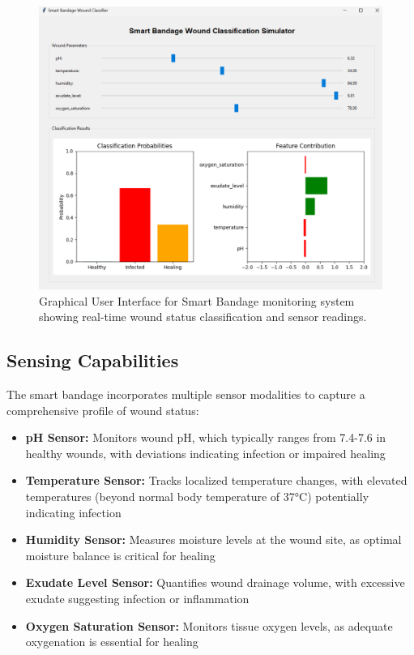\documentclass[conference]{IEEEtran}
\begin{document}
\begin{figure}[H]
    \centering
    \includegraphics[width=\textwidth]{figures/GUI_Simulation_image.png}
    \caption{Graphical User Interface for Smart Bandage monitoring system showing real-time wound status classification and sensor readings.}
    \label{fig:gui_simulation}
\end{figure}

\subsection{Sensing Capabilities}
The smart bandage incorporates multiple sensor modalities to capture a comprehensive profile of wound status:

\begin{itemize}
    \item \textbf{pH Sensor:} Monitors wound pH, which typically ranges from 7.4-7.6 in healthy wounds, with deviations indicating infection or impaired healing
    \item \textbf{Temperature Sensor:} Tracks localized temperature changes, with elevated temperatures (beyond normal body temperature of 37°C) potentially indicating infection
    \item \textbf{Humidity Sensor:} Measures moisture levels at the wound site, as optimal moisture balance is critical for healing
    \item \textbf{Exudate Level Sensor:} Quantifies wound drainage volume, with excessive exudate suggesting infection or inflammation
    \item \textbf{Oxygen Saturation Sensor:} Monitors tissue oxygen levels, as adequate oxygenation is essential for healing
\end{itemize}
\end{document}
